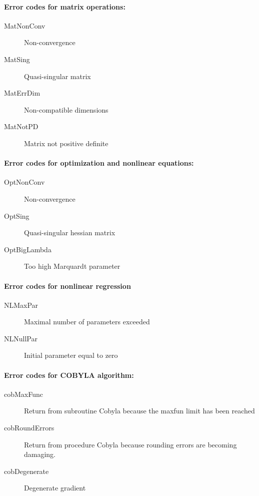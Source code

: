 \documentclass[12pt,a4paper,oneside]{report}
\newcommand{\lmatha}[1]{   %
	\marginpar{\vspace{#1} 
		\begin{flushright}
			LMath 0.5
	\end{flushright} }
}
\begin{document}
\paragraph{Error codes for matrix operations:}
\begin{description}
	\item[MatNonConv] Non{-}convergence \label{uErrors-MatNonConv}
	\item[MatSing]	Quasi{-}singular matrix \label{uErrors-MatSing}
	\item[MatErrDim] Non{-}compatible dimensions \label{uErrors-MatErrDim}
	\item[MatNotPD] Matrix not positive definite \label{uErrors-MatNotPD}
\end{description}
\paragraph{Error codes for optimization and nonlinear equations:}
\begin{description}
	\item[OptNonConv] Non{-}convergence \label{uErrors-OptNonConv}
	\item[OptSing] Quasi{-}singular hessian matrix \label{uErrors-OptSing}
	\item[OptBigLambda] Too high Marquardt parameter \label{uErrors-OptBigLambda}
\end{description}
\paragraph{Error codes for nonlinear regression}
\begin{description}
	\item[NLMaxPar]	Maximal number of parameters exceeded \label{uErrors-NLMaxPar}
	\item[NLNullPar] Initial parameter equal to zero \label{uErrors-NLNullPar}
\end{description}
\paragraph{Error codes for COBYLA algorithm:}
\lmatha{0pt}
\begin{description}
	\item[cobMaxFunc] Return from subroutine Cobyla because the maxfun limit has been reached
	\item[cobRoundErrors] Return from procedure Cobyla because rounding errors are becoming damaging.
	\item[cobDegenerate] Degenerate gradient
\end{description}
\end{document}
